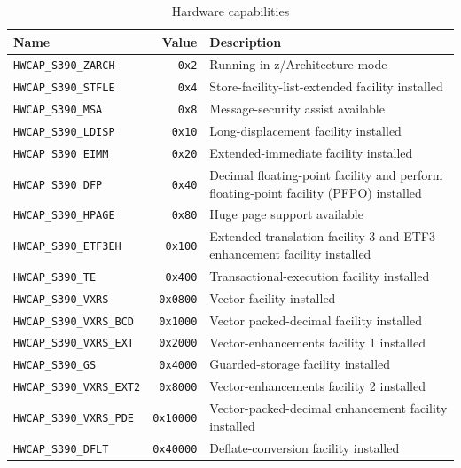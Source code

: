 \documentclass[USenglish,fontsize=11pt,twoside,%
  toc=bib,toc=idx,toc=graduated,numbers=noendperiod,
  bookmarks=true,
  bookmarksnumbered=true,
  bookmarksopen=true,
  bookmarksopenlevel=1,
  breaklinks=true,
  colorlinks=true,
  linkcolor=black,
  pdfpagelayout={TwoPageRight},
  pdfusetitle=true
]{scrreprt}
\newenvironment{DIFnomarkup}{}{} %
\begin{document}
\begin{table}
  \centering
  \begin{DIFnomarkup}
  \begin{tabularx}{\textwidth}{lr>{\raggedright\arraybackslash}X}
    \toprule
    Name & Value & Description \\
    \midrule
    \texttt{HWCAP\_S390\_ZARCH} & \texttt{0x2}
    & Running in z/Architecture mode \\
    \texttt{HWCAP\_S390\_STFLE} & \texttt{0x4}
    & Store-facility-list-extended facility installed \\
    \texttt{HWCAP\_S390\_MSA} & \texttt{0x8}
    & Message-security assist available \\
    \texttt{HWCAP\_S390\_LDISP} & \texttt{0x10}
    & Long-displacement facility installed \\
    \texttt{HWCAP\_S390\_EIMM} & \texttt{0x20}
    & Extended-immediate facility installed \\
    \texttt{HWCAP\_S390\_DFP} & \texttt{0x40}
    & Decimal floating-point facility and perform floating-point
    facility (PFPO) installed \\
    \texttt{HWCAP\_S390\_HPAGE} & \texttt{0x80}
    & Huge page support available \\
    \texttt{HWCAP\_S390\_ETF3EH} & \texttt{0x100}
    & Extended-translation facility 3 and ETF3-enhancement
    facility installed \\
    \texttt{HWCAP\_S390\_TE} & \texttt{0x400}
    & Transactional-execution facility installed \\
    \texttt{HWCAP\_S390\_VXRS} & \texttt{0x0800}
    & Vector facility installed \\
    \texttt{HWCAP\_S390\_VXRS\_BCD} & \texttt{0x1000}
    & Vector packed-decimal facility installed \\
    \texttt{HWCAP\_S390\_VXRS\_EXT} & \texttt{0x2000}
    & Vector-enhancements facility 1 installed \\
    \texttt{HWCAP\_S390\_GS} & \texttt{0x4000}
    & Guarded-storage facility installed \\
    \texttt{HWCAP\_S390\_VXRS\_EXT2} & \texttt{0x8000}
    & Vector-enhancements facility 2 installed \\
    \texttt{HWCAP\_S390\_VXRS\_PDE} & \texttt{0x10000}
    & Vector-packed-decimal enhancement facility installed \\
    \texttt{HWCAP\_S390\_DFLT} & \texttt{0x40000}
    & Deflate-conversion facility installed \\
    \bottomrule
  \end{tabularx}
  \end{DIFnomarkup}
  \caption{Hardware capabilities}
  \label{tab:hwcap}
\end{table}
\end{document}
